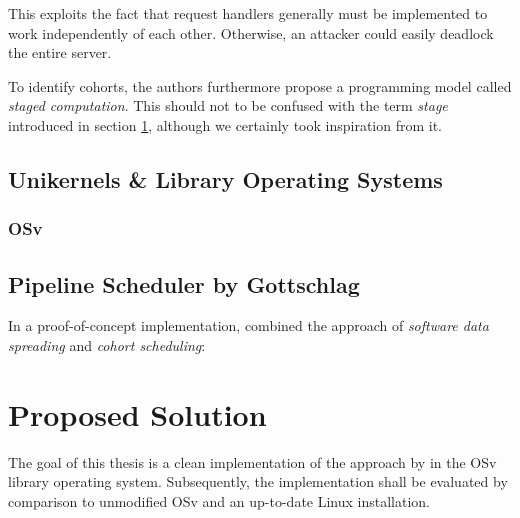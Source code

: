 \documentclass{article}
\begin{document}
This exploits the fact that request handlers generally must be implemented to work independently of each other.
Otherwise, an attacker could easily deadlock the entire server.

To identify cohorts, the authors furthermore propose a programming model called \textit{staged computation}.
This should not to be confused with the term \textit{stage} introduced in section \ref{propsolution},
although we certainly took inspiration from it.

\subsection{Unikernels \& Library Operating Systems}
\subsubsection{OSv}

\subsection{Pipeline Scheduler by Gottschlag}

In a proof-of-concept implementation, \citeauthor{gottschlag2017} combined the approach of \textit{software data spreading} and \textit{cohort scheduling}:



\section{Proposed Solution}\label{propsolution}

The goal of this thesis is a clean implementation of the approach by \citeauthor{gottschlag2017} in the OSv library operating system.
Subsequently, the implementation shall be evaluated by comparison to unmodified OSv and an up-to-date Linux installation.
\end{document}
